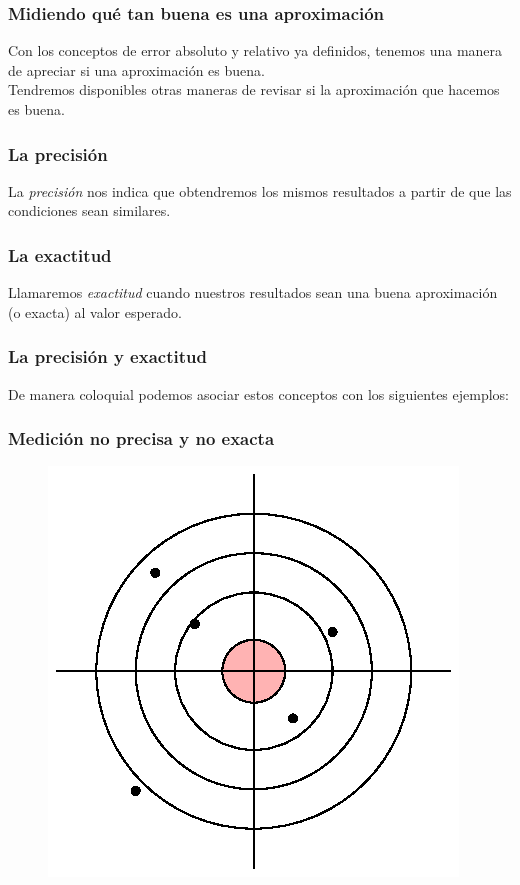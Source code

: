 \documentclass[12pt]{beamer}
\begin{document}
\begin{frame}
\frametitle{Midiendo qué tan buena es una aproximación}
Con los conceptos de error absoluto y relativo ya definidos, tenemos una manera de apreciar si una aproximación es buena.
\\
\bigskip
\pause
Tendremos disponibles otras maneras de revisar si la aproximación que hacemos es buena.
\end{frame}
\begin{frame}
\frametitle{La precisión}
La \emph{precisión} nos indica que obtendremos los mismos resultados a partir de que las condiciones sean similares.
\end{frame}
\begin{frame}
\frametitle{La exactitud}
Llamaremos \emph{exactitud} cuando nuestros resultados sean una buena aproximación (o exacta) al valor esperado.
\end{frame}
\begin{frame}
\frametitle{La precisión y exactitud}
De manera coloquial podemos asociar estos conceptos con los siguientes ejemplos:
\end{frame}
\begin{frame}
\frametitle{Medición no precisa y no exacta}
\begin{figure}
    \centering  
    \includegraphics[scale=1]{Imagenes/exactitud_precision_03.eps}
\end{figure}
\end{frame}
\end{document}
